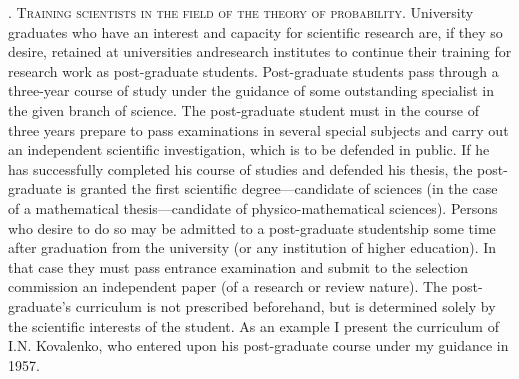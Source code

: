 \medskip
{}. \textsc{Training scientists in the field of the theory of
  probability.} University graduates who have an interest and capacity
for scientific research are, if they so desire, retained at
universities and\pageoriginale research institutes to continue their
training for research work as post-graduate students. Post-graduate
students pass through a three-year course of study under the guidance
of some outstanding specialist in the given branch of science. The
post-graduate student must in the course of three years prepare to
pass examinations in several special subjects and carry out an
independent scientific investigation, which is to be defended in
public. If he has successfully completed his course of studies and
defended his thesis, the post-graduate is granted the first scientific
degree---candidate of sciences (in the case of a mathematical
thesis---candidate of physico-mathematical sciences). Persons who
desire to do so may be admitted to a post-graduate studentship some
time after graduation from the university (or any institution of
higher education). In that case they must pass entrance examination
and submit to the selection commission an independent paper (of a
research or review nature). The post-graduate's curriculum is not
prescribed beforehand, but is determined solely by the scientific
interests of the student. As an example I present the curriculum of
I.N. Kovalenko, who entered upon his post-graduate course under my
guidance in 1957.
